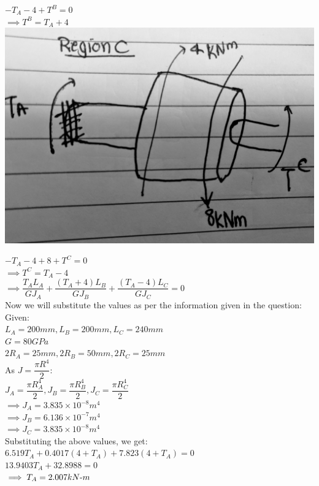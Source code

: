 \documentclass{article}
\begin{document}
\bigbreak
\noindent $ -T_A-4+T^B=0$\\
$\implies T^B=T_A+4$\\

\includegraphics[scale=0.05]{C.jpg}

\bigbreak
\noindent $- T_A-4+8+T^C=0$\\
$\implies T^C=T_A-4$\\

\noindent $\implies \dfrac{T_AL_A}{GJ_A}+ \dfrac{(T_A+4)L_B}{GJ_B}+ \dfrac{(T_A-4)L_C}{GJ_C}=0 $\\


\noindent Now we will substitute the values as per the information given in the question:\\
Given:\\ $L_A=200mm, L_B=200mm, L_C=240mm $\\
$G= 80GPa$\\
$2R_A =25mm, 2R_B= 50mm, 2R_C= 25mm$\\
As $J= \dfrac{\pi R^4}{2}$: \\
$J_A= \dfrac{\pi R_A^4}{2}, J_B= \dfrac{\pi R_B^4}{2}, J_C= \dfrac{\pi R_C^4}{2}$\\
$\implies J_A= 3.835 \times 10^{-8} m^4$\\
$\implies J_B= 6.136 \times 10^{-7} m^4$\\
$\implies J_C= 3.835 \times 10^{-8} m^4$\\

\noindent Substituting the above values, we get:\\
$6.519T_A+0.4017(4+T_A)+7.823(4+T_A)=0$\\
$13.9403T_A+32.8988=0$\\
$\implies T_A= 2.007 kN{\text -}m$\\
\end{document}

